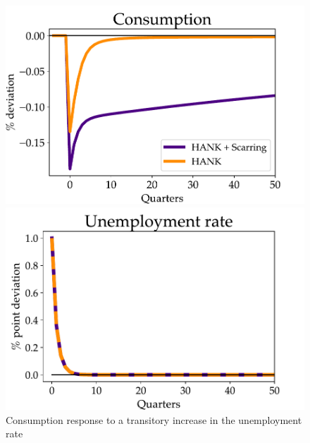 \begin{figure}[!ht]
    \centering
   \begin{minipage}{0.49\textwidth}
        \centering
        \includegraphics[width=1.1\textwidth]{text/chapter1/Figures/CJAC_JF_real_comparison} 
    \end{minipage}\hfill
    \begin{minipage}{0.49\textwidth}
        \centering
        \includegraphics[width=1.1\textwidth]{text/chapter1/Figures/Urate_response_PE}
    \end{minipage}
    \caption{Consumption response to a transitory increase in the unemployment rate}
    \label{Micro_results}
\end{figure}





